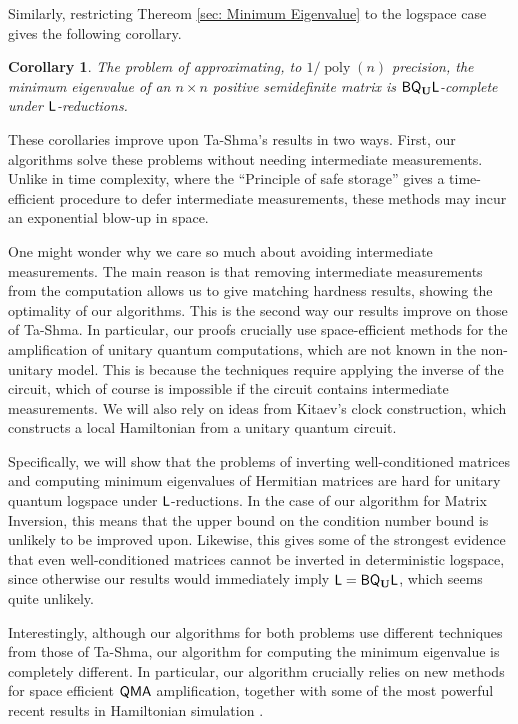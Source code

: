 \documentclass[11pt]{article}
\newtheorem{corollary}[theorem]{Corollary}
\theoremstyle{definition}
\theoremstyle{remark}
\newcommand\QMA{{\sf{QMA}}}
\newcommand\Logspace{{\sf{L}}}
\newcommand{\classfont}{\sf}
\newcommand{\Unitary}{\mathbf{U}}
\newcommand{\unitaryBQL}{{\classfont{BQ}_\Unitary\classfont{L}}}
\DeclareMathOperator{\poly}{poly}
\begin{document}
Similarly, restricting Thereom \ref{sec: Minimum Eigenvalue} to the logspace case gives the following corollary.
\begin{corollary}
The problem of approximating, to $1/\poly(n)$ precision, the minimum eigenvalue of an $n \times n$ positive semidefinite matrix is $\unitaryBQL$-complete under $\Logspace$-reductions.
\end{corollary}

These corollaries improve upon Ta-Shma's results \cite{tashma} in two ways. First, our algorithms  solve these problems without needing intermediate measurements.  Unlike in time complexity, where the ``Principle of safe storage'' gives a time-efficient procedure to defer intermediate measurements, these methods may incur an exponential blow-up in space.  

One might wonder why we care so much about avoiding intermediate measurements.  The main reason is that removing intermediate measurements from the computation allows us to give matching hardness results, showing the optimality of our algorithms.  This is the second way our results improve on those of Ta-Shma.  In particular, our proofs crucially use space-efficient methods for the amplification of unitary quantum computations, which are not known in the non-unitary model.  This is because the techniques require applying the inverse of the circuit, which of course is impossible if the circuit contains intermediate measurements.  We will also rely on ideas from Kitaev's clock construction, which constructs a local Hamiltonian from a unitary quantum circuit. 

Specifically, we will show that the problems of inverting well-conditioned matrices and computing minimum eigenvalues of Hermitian matrices are hard for unitary quantum logspace under $\Logspace$-reductions. In the case of our algorithm for Matrix Inversion, this means that the upper bound on the condition number bound is unlikely to be improved upon.  Likewise, this gives some of the strongest evidence that even well-conditioned matrices cannot be inverted in deterministic logspace, since otherwise our results would immediately imply $\Logspace=\unitaryBQL$, which seems quite unlikely. 

Interestingly, although our algorithms for both problems use different techniques from those of Ta-Shma, our algorithm for computing the minimum eigenvalue is completely different.  In particular, our algorithm crucially relies on new methods for space efficient $\QMA$ amplification, together with some of the most powerful recent results in Hamiltonian simulation \cite{berry14,berry15}.
\end{document}
